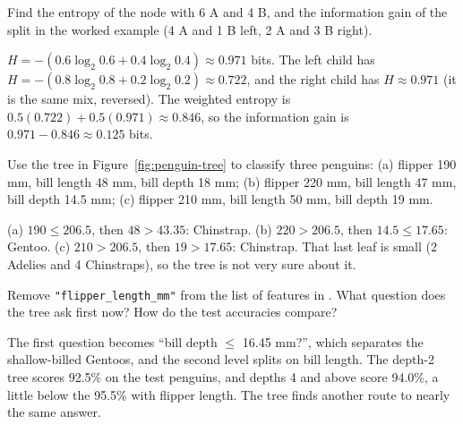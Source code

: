 \begin{Exercise}[label=dt4, title={Information gain}, space=3cm]
Find the entropy of the node with 6 A and 4 B, and the information gain of the split in the worked example (4 A
and 1 B left, 2 A and 3 B right).
\end{Exercise}
\begin{Answer}[ref=dt4]
$H = -(0.6\log_2 0.6 + 0.4\log_2 0.4) \approx 0.971$ bits. The left child has
$H = -(0.8\log_2 0.8 + 0.2\log_2 0.2) \approx 0.722$, and the right child has $H \approx 0.971$ (it is the same mix,
reversed). The weighted entropy is $0.5(0.722) + 0.5(0.971) \approx 0.846$, so the information gain is
$0.971 - 0.846 \approx 0.125$ bits.
\end{Answer}

\begin{Exercise}[label=dt5, title={Follow the tree}]
Use the tree in Figure~\ref{fig:penguin-tree} to classify three penguins: (a) flipper 190 mm, bill length 48 mm,
bill depth 18 mm; (b) flipper 220 mm, bill length 47 mm, bill depth 14.5 mm; (c) flipper 210 mm, bill length
50 mm, bill depth 19 mm.
\end{Exercise}
\begin{Answer}[ref=dt5]
(a) $190 \le 206.5$, then $48 > 43.35$: Chinstrap. (b) $220 > 206.5$, then $14.5 \le 17.65$: Gentoo.
(c) $210 > 206.5$, then $19 > 17.65$: Chinstrap. That last leaf is small (2 Adelies and 4 Chinstraps), so the tree
is not very sure about it.
\end{Answer}

\begin{Exercise}[label=dt6, title={No flippers}]
Remove \verb|"flipper_length_mm"| from the list of features in . What question does the tree ask
first now? How do the test accuracies compare?
\end{Exercise}
\begin{Answer}[ref=dt6]
The first question becomes ``bill depth $\le$ 16.45 mm?'', which separates the shallow-billed Gentoos, and the
second level splits on bill length. The depth-2 tree scores 92.5\% on the test penguins, and depths 4 and above
score 94.0\%, a little below the 95.5\% with flipper length. The tree finds another route to nearly the same
answer.
\end{Answer}
